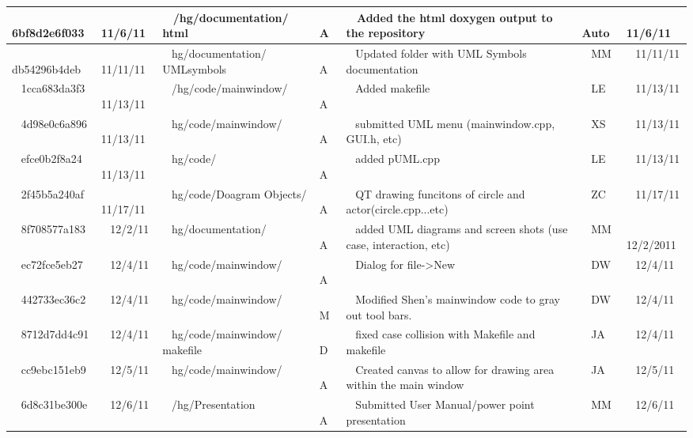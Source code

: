 \documentclass[twoside,letterpaper]{article}
\begin{document}
\begin{flushleft}
\begin{supertabular}{|m{1.0in}|m{0.6in}|p{1.5in}|m{.25in}|m{2.0in}|m{.7in}|m{0.65in}|}
\\\hline
~
6bf8d2e6f033 &
~
11/6/11 &
~
/hg/documentation/ html &
~
A &
~
Added the html doxygen output to the repository &
~
Auto &
~
11/6/11


\\\hline
~
db54296b4deb &
~
11/11/11 &
~
hg/documentation/ UMLsymbols &
~
A &
~
Updated folder with UML Symbols documentation &
~
MM &
~
11/11/11


\\\hline
~
1cca683da3f3 &
~
11/13/11 &
~
/hg/code/mainwindow/ &
~
A &
~
Added makefile &
~
LE &
~
11/13/11


\\\hline
~
4d98e0c6a896 &
~
11/13/11 &
~
hg/code/mainwindow/ &
~
A &
~
submitted UML menu (mainwindow.cpp, GUI.h, etc) &
~
XS &
~
11/13/11


\\\hline
~
efce0b2f8a24 &
~
11/13/11 &
~
hg/code/ &
~
A &
~
added pUML.cpp &
~
LE &
~
11/13/11


\\\hline
~
2f45b5a240af &
~
11/17/11 &
~
hg/code/Doagram Objects/ &
~
A &
~
QT drawing funcitons of circle and actor(circle.cpp...etc) &
~
ZC &
~
11/17/11


\\\hline
~
8f708577a183 &
~
12/2/11 &
~
hg/documentation/ &
~
A &
~
added UML diagrams and screen shots (use case, interaction, etc) &
~
MM &
~
12/2/2011


\\\hline
~
ec72fce5eb27 &
~
12/4/11 &
~
hg/code/mainwindow/ &
~
A &
~
Dialog for file->New &
~
DW &
~
12/4/11

\\\hline
~
442733ec36c2 &
~
12/4/11 &
~
hg/code/mainwindow/  &
~
M &
~
Modified Shen's mainwindow code to gray out tool bars. &
~
DW &
~
12/4/11


\\\hline
~
8712d7dd4c91 &
~
12/4/11 &
~
hg/code/mainwindow/ makefile &
~
D &
~
fixed case collision with Makefile and makefile &
~
JA &
~
12/4/11


\\\hline
~
cc9ebc151eb9 &
~
12/5/11 &
~
hg/code/mainwindow/ &
~
A &
~
Created canvas to allow for drawing area within the main window &
~
JA &
~
12/5/11



\\\hline
~
6d8c31be300e &
~
12/6/11 &
~
/hg/Presentation &
~
A &
~
Submitted User Manual/power point presentation &
~
MM &
~
12/6/11



\end{supertabular}
\end{flushleft}
\end{document}
